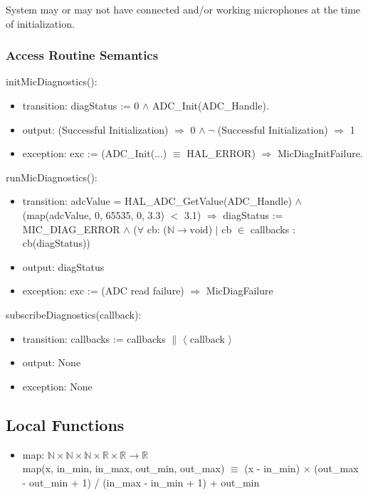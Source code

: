 \documentclass[12pt, titlepage]{article}
\begin{document}
System may or may not have connected and/or working microphones at the time of
initialization.

\subsubsection{Access Routine Semantics}
\noindent initMicDiagnostics():
\begin{itemize}
  \item transition: diagStatus := 0 \(\wedge\) ADC\_Init(ADC\_Handle).
  \item output: (Successful Initialization) \(\Rightarrow\) 0 \(\wedge\ \neg\)
    (Successful Initialization) \(\Rightarrow\) 1
  \item exception: exc := (ADC\_Init(...) \(\equiv\) HAL\_ERROR) \(\Rightarrow\)
  MicDiagInitFailure.
\end{itemize}

\noindent runMicDiagnostics():
\begin{itemize}
  \item transition: adcValue = HAL\_ADC\_GetValue(ADC\_Handle) \(\wedge\)
    (map(adcValue, 0, 65535, 0, 3.3) \(<\) 3.1) \(\Rightarrow\) diagStatus :=
    MIC\_DIAG\_ERROR \(\wedge\) (\(\forall\) cb: (\(\mathbb{N} \rightarrow
    \text{void}\)) \(\vert\) cb \(\in\) callbacks : cb(diagStatus))
    \item output: diagStatus
    \item exception: exc := (ADC read failure) \(\Rightarrow\) MicDiagFailure
\end{itemize}

\noindent subscribeDiagnostics(callback)\label{mdiag:subscribe}:
\begin{itemize}
  \item transition: callbacks := callbacks \(\parallel\) \(\langle\) callback
  \(\rangle\)
  \item output: None
  \item exception: None
\end{itemize}


\subsection{Local Functions}
\begin{itemize}
  \item map: \(\mathbb{N} \times \mathbb{N} \times \mathbb{N} \times \mathbb{R}
  \times \mathbb{R} \rightarrow \mathbb{R}\)\\
  map(x, in\_min, in\_max, out\_min, out\_max) \(\equiv\) (x - in\_min)
  \(\times\) (out\_max - out\_min + 1) / (in\_max - in\_min + 1) + out\_min
\end{itemize}
\end{document}
